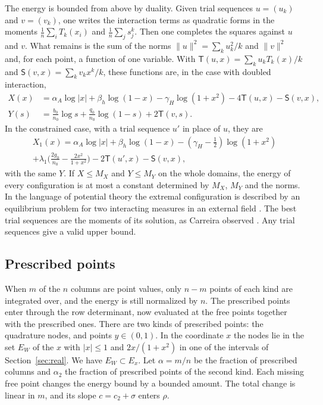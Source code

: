 The energy is bounded from above by duality. Given trial sequences $u=(u_k)$ and $v=(v_k)$, one writes the
interaction terms as quadratic forms in the moments $\frac1n\sum_iT_k(x_i)$ and $\frac1n\sum_js_j^k$. Then one
completes the squares against $u$ and $v$. What remains is the sum of the norms $\|u\|^2=\sum_ku_k^2/k$ and
$\|v\|^2$ and, for each point, a function of one variable. With $\mathsf T(u,x)=\sum_ku_kT_k(x)/k$ and
$\mathsf S(v,x)=\sum_kv_kx^k/k$, these functions are, in the case with doubled interaction,
\begin{align*}
 X(x)&=\alpha_A\log|x|+\beta_h\log(1-x)-\gamma_H\log(1+x^2)-4\mathsf T(u,x)-\mathsf S(v,x),\\
 Y(s)&=\tfrac{b_0}{n_0}\log s+\tfrac{q_0}{n_0}\log(1-s)+2\mathsf T(v,s).
\end{align*}
In the constrained case, with a trial sequence $u'$ in place of $u$, they are
\begin{multline*}
 X_1(x)=\alpha_A\log|x|+\beta_h\log(1-x)-(\gamma_H-\tfrac12)\log(1+x^2)\\
 +\lambda_1\bigl(\tfrac{2g_0}{n_0}-\tfrac{2x^2}{1+x^2}\bigr)-2\mathsf T(u',x)-\mathsf S(v,x),
\end{multline*}
with the same $Y$. If $X\le M_X$ and $Y\le M_Y$ on the whole domains, the energy of every configuration is at
most a constant determined by $M_X$, $M_Y$ and the norms. In the language of potential theory the extremal
configuration is described by an equilibrium problem for two interacting measures in an external field
\cite{SaffTotik}. The best trial sequences are the moments of its solution, as Carreira observed
\cite{Carreira2026}. Any trial sequences give a valid upper bound.

\subsection{Prescribed points}\label{ssec:prescribed}
When $m$ of the $n$ columns are point values, only $n-m$ points of each kind are integrated over, and the
energy is still normalized by $n$. The prescribed points enter through the row determinant, now evaluated
at the free points together with the prescribed ones. There are two kinds of prescribed points: the
quadrature nodes, and points $y\in(0,1)$. In the coordinate $x$ the nodes lie in the set $E_W$ of the $x$ with
$|x|\le1$ and $2x/(1+x^2)$ in one of the intervals of Section~\ref{sec:real}. We have $E_W\subset E_x$. Let
$\alpha=m/n$ be the fraction of prescribed columns and $\alpha_2$ the fraction of prescribed points of the
second kind. Each missing free point changes the energy bound by a bounded amount. The total change is linear
in $m$, and its slope $c=c_2+\sigma$ enters $\rho$.

